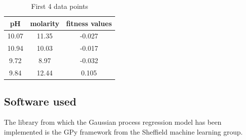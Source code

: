 \documentclass[a4paper]{article}
\begin{document}
\begin{table}[]
	\centering
	\caption{First 4 data points}
	\label{table}
	\begin{tabular}{|c|c|c|}
		\hline
		\textbf{pH} & \textbf{molarity} & \textbf{fitness values} \\ \hline
		10.07 & 11.35   & -0.027            \\ \hline
		10.94 & 10.03      & -0.017            \\ \hline
		9.72  & 8.97     & -0.032            \\ \hline
		9.84 & 12.44       & 0.105             \\ \hline
	\end{tabular}
\end{table}

\subsection{Software used}
The library from which the Gaussian process regression model has been implemented is the GPy framework from the Sheffield machine learning group. \cite{gpy}
\end{document}
